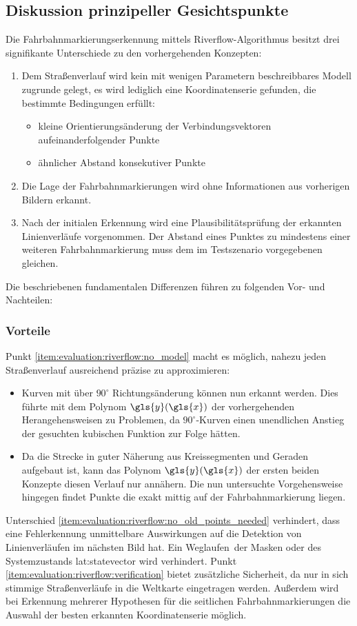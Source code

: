 \subsection{Diskussion prinzipeller Gesichtspunkte} 
Die Fahrbahnmarkierungserkennung mittels Riverflow-Algorithmus besitzt drei signifikante Unterschiede zu den vorhergehenden Konzepten:
\begin{enumerate}
\item \label{item:evaluation:riverflow:no_model}
Dem Straßenverlauf wird kein mit wenigen Parametern beschreibbares Modell zugrunde gelegt, es wird lediglich eine Koordinatenserie gefunden, die bestimmte Bedingungen erfüllt:
\begin{itemize}
\item kleine Orientierungsänderung der Verbindungsvektoren aufeinanderfolgender Punkte
\item ähnlicher Abstand konsekutiver Punkte
\end{itemize}
\item \label{item:evaluation:riverflow:no_old_points_needed}
Die Lage der Fahrbahnmarkierungen wird ohne Informationen aus vorherigen Bildern erkannt.
\item \label{item:evaluation:riverflow:verification}
Nach der initialen Erkennung wird eine Plausibilitätsprüfung der erkannten Linienverläufe vorgenommen. Der Abstand eines Punktes zu mindestens einer weiteren Fahrbahnmarkierung muss dem im Testszenario vorgegebenen gleichen. 
\end{enumerate}
Die beschriebenen fundamentalen Differenzen führen zu folgenden Vor- und Nachteilen:

\subsubsection{Vorteile}
Punkt \ref{item:evaluation:riverflow:no_model} macht es möglich, nahezu jeden Straßenverlauf ausreichend präzise zu approximieren:
\begin{itemize} 
\item
Kurven mit über \(90^{\circ}\) Richtungsänderung können nun erkannt werden. Dies führte mit dem Polynom \(\gls{y}(\gls{x})\) der vorhergehenden Herangehensweisen zu Problemen, da \(90^{\circ}\)-Kurven einen unendlichen Anstieg der gesuchten kubischen Funktion zur Folge hätten.
\item
Da die Strecke in guter Näherung aus Kreissegmenten und Geraden aufgebaut ist, kann das  Polynom \(\gls{y}(\gls{x})\) der ersten beiden Konzepte diesen Verlauf nur annähern. Die nun untersuchte Vorgehensweise hingegen findet Punkte die exakt mittig auf der Fahrbahnmarkierung liegen.
\end{itemize}
Unterschied \ref{item:evaluation:riverflow:no_old_points_needed} verhindert, dass eine Fehlerkennung unmittelbare Auswirkungen auf die Detektion von Linienverläufen im nächsten Bild hat. Ein \glqq Weglaufen\grqq\ der Masken oder des Systemzustands \gls{lat:statevector} wird verhindert.
Punkt \ref{item:evaluation:riverflow:verification} bietet zusätzliche Sicherheit, da nur in sich stimmige Straßenverläufe in die Weltkarte eingetragen werden. Außerdem wird bei Erkennung mehrerer Hypothesen für die seitlichen Fahrbahnmarkierungen die Auswahl der besten erkannten Koordinatenserie möglich.

